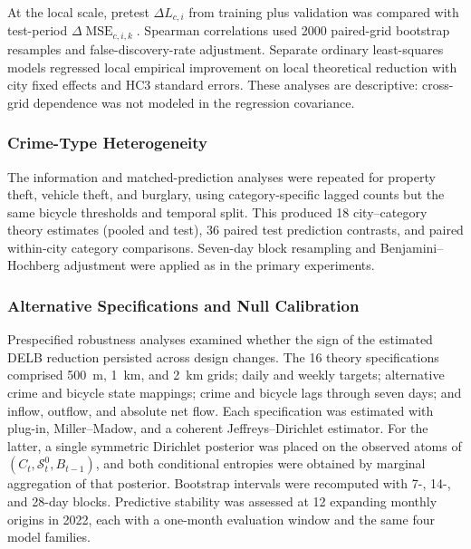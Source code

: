 \documentclass[applsci,article,accept,moreauthors]{Definitions/mdpi}
\begin{document}
At the local scale, pretest \(\Delta L_{c,i}\) from training plus
validation was compared with test-period
\(\Delta\operatorname{MSE}_{c,i,k}\). Spearman correlations used 2000
paired-grid bootstrap resamples and false-discovery-rate adjustment.
Separate ordinary least-squares models regressed local empirical
improvement on local theoretical reduction with city fixed effects and
HC3 standard errors. These analyses are descriptive: cross-grid dependence
was not modeled in the regression covariance.

\subsubsection{Crime-Type Heterogeneity}
\label{subsec:crime_type_methods}

The information and matched-prediction analyses were repeated for property
theft, vehicle theft, and burglary, using category-specific lagged counts
but the same bicycle thresholds and temporal split. This produced 18
city--category theory estimates (pooled and test), 36 paired test prediction
contrasts, and paired within-city category comparisons. Seven-day block
resampling and Benjamini--Hochberg adjustment were applied as in the primary
experiments.

\subsubsection{Alternative Specifications and Null Calibration}
\label{subsec:robustness_null_methods}

Prespecified robustness analyses examined whether the sign of the estimated
DELB reduction persisted across design changes. The 16 theory
specifications comprised
500~m, 1~km, and 2~km grids; daily and weekly targets; alternative crime and
bicycle state mappings; crime and bicycle lags through seven days; and
inflow, outflow, and absolute net flow. Each specification was estimated
with plug-in, Miller--Madow, and a coherent Jeffreys--Dirichlet estimator.
For the latter, a single symmetric Dirichlet posterior was placed on the
observed atoms of \((C_t,\mathcal S^0_t,B_{t-1})\), and both conditional
entropies were obtained by marginal aggregation of that posterior. Bootstrap
intervals were recomputed with 7-, 14-, and 28-day blocks. Predictive
stability was assessed at 12 expanding monthly origins in 2022, each with a
one-month evaluation window and the same four model families.
\end{document}
